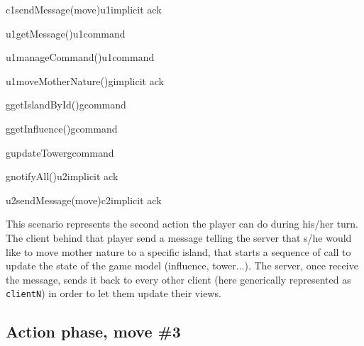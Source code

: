 \documentclass[a4paper]{article}
\begin{document}
	\begin{center}
		\begin{sequencediagram}

			\begin{call}{c1}{sendMessage(move)}{u1}{implicit ack}
				\begin{call}{u1}{getMessage()}{u1}{command}
				\end{call}
				\begin{call}{u1}{manageCommand()}{u1}{command}
				\end{call}
				\begin{call}{u1}{moveMotherNature()}{g}{implicit ack}
					\begin{call}{g}{getIslandById()}{g}{command}
					\end{call}
					\begin{call}{g}{getInfluence()}{g}{command}
					\end{call}
					\begin{call}{g}{updateTower}{g}{command}
					\end{call}
					\begin{call}{g}{notifyAll()}{u2}{implicit ack}
						\begin{call}{u2}{sendMessage(move)}{c2}{implicit ack}
						\end{call}
					\end{call}
				\end{call}
			\end{call}
		\end{sequencediagram}
	\end{center}

	This scenario represents the second action the player can do during his/her turn. The client behind that player send a message telling the server that s/he would like to move mother nature to a specific island, that starts a sequence of call to update the state of the game model (influence, tower...). The server, once receive the message, sends it back to every other client (here generically represented as \verb|clientN|) in order to let them update their views.

	\pagebreak

	\subsection{Action phase, move \#3}
\end{document}
